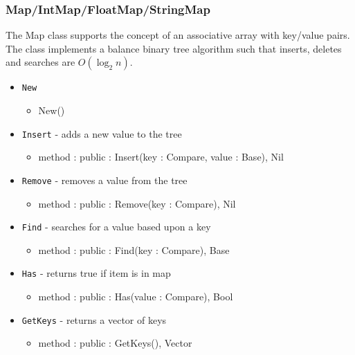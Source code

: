 \documentclass[12pt]{article}
\begin{document}
\subsubsection{Map/IntMap/FloatMap/StringMap}
The Map class supports the concept of an associative array with key/value pairs.  The class implements a balance binary tree algorithm such that inserts, deletes and searches are $O(\log_2 n)$.
\begin{itemize}
\item \texttt{New}
  \begin{itemize}
  \item New()
  \end{itemize} 
\item \texttt{Insert} - adds a new value to the tree
  \begin{itemize}
  \item method : public : Insert(key : Compare, value : Base), Nil
  \end{itemize}
\item \texttt{Remove} - removes a value from the tree
  \begin{itemize}
  \item method : public : Remove(key : Compare), Nil
  \end{itemize}
\item \texttt{Find} - searches for a value based upon a key
  \begin{itemize}
  \item method : public : Find(key : Compare), Base
  \end{itemize}
\item \texttt{Has} - returns true if item is in map
  \begin{itemize}
  \item method : public : Has(value : Compare), Bool
  \end{itemize}
\item \texttt{GetKeys} - returns a vector of keys
  \begin{itemize}
  \item method : public : GetKeys(), Vector
  \end{itemize}
\end{itemize}
\end{document}
